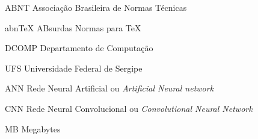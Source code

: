 
\begin{siglas}
	\item[ABNT]{Associação Brasileira de Normas Técnicas}
	\item[abnTeX]{ABsurdas Normas para TeX}
  	\item[DCOMP]{Departamento de Computação}
	\item[UFS]{Universidade Federal de Sergipe}
	\item[ANN]{Rede Neural Artificial ou \textit{Artificial Neural network}}
	\item[CNN]{Rede Neural Convolucional ou \textit{Convolutional Neural Network}}
	\item[MB]{Megabytes}
\end{siglas}
